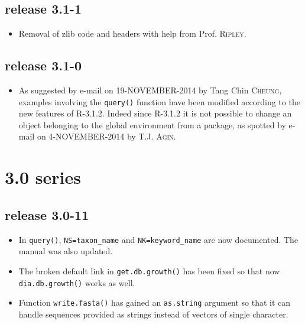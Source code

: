 \documentclass{article}
\begin{document}
\subsection*{release 3.1-1}

\begin{itemize}

\item Removal of zlib code and headers with help from Prof. \textsc{Ripley}.

\end{itemize}

\subsection*{release 3.1-0}

\begin{itemize}

\item As suggested by e-mail on 19-NOVEMBER-2014 by Tang Chin \textsc{Cheung}, examples involving the  \texttt{query()} function  have been modified according to the new features of R-3.1.2.  Indeed since R-3.1.2 it is not possible to change an object belonging to the global environment from a package, as spotted by e-mail on 4-NOVEMBER-2014 by T.J. \textsc{Agin}.


\end{itemize}


\section*{3.0 series}

\subsection*{release 3.0-11}

\begin{itemize}

\item In \texttt{query()}, \texttt{NS=taxon\_name} and \texttt{NK=keyword\_name} are now documented. The manual was also updated.

\item The broken default link in \texttt{get.db.growth()} has been fixed so
that now \texttt{dia.db.growth()} works as well.

\item Function \texttt{write.fasta()} has gained an \texttt{as.string} argument so that it can handle sequences provided as strings instead of vectors of single character.

\end{itemize}
\end{document}
